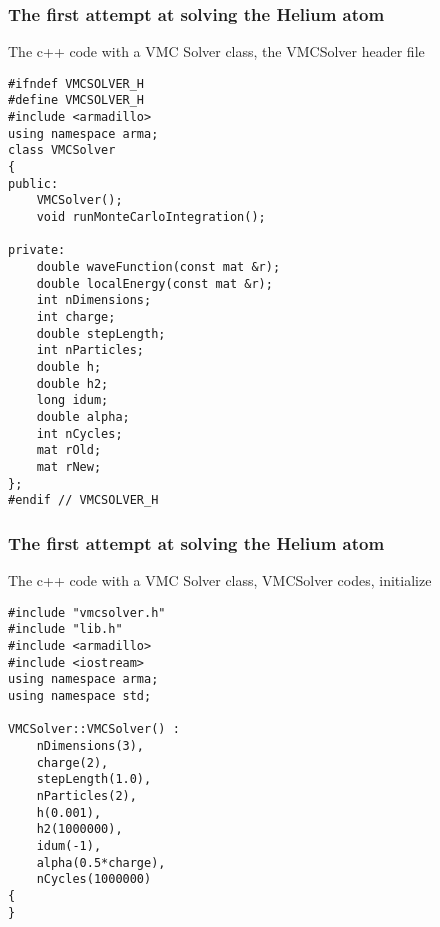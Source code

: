 \documentclass{beamer}
\begin{document}
\begin{frame}
\frametitle{The first attempt at solving the Helium atom}

\begin{block}{The c++ code with a VMC Solver class, the VMCSolver header file }

\begin{verbatim}
#ifndef VMCSOLVER_H
#define VMCSOLVER_H
#include <armadillo>
using namespace arma;
class VMCSolver
{
public:
    VMCSolver();
    void runMonteCarloIntegration();

private:
    double waveFunction(const mat &r);
    double localEnergy(const mat &r);
    int nDimensions;
    int charge;
    double stepLength;
    int nParticles;
    double h;
    double h2;
    long idum;
    double alpha;
    int nCycles;
    mat rOld;
    mat rNew;
};
#endif // VMCSOLVER_H
\end{verbatim}
\end{block}
\end{frame}

\begin{frame}
\frametitle{The first attempt at solving the Helium atom}

\begin{block}{The c++ code with a VMC Solver class, VMCSolver codes, initialize }

\begin{verbatim}
#include "vmcsolver.h"
#include "lib.h"
#include <armadillo>
#include <iostream>
using namespace arma;
using namespace std;

VMCSolver::VMCSolver() :
    nDimensions(3),
    charge(2),
    stepLength(1.0),
    nParticles(2),
    h(0.001),
    h2(1000000),
    idum(-1),
    alpha(0.5*charge),
    nCycles(1000000)
{
}
\end{verbatim}
\end{block}
\end{frame}
\end{document}
